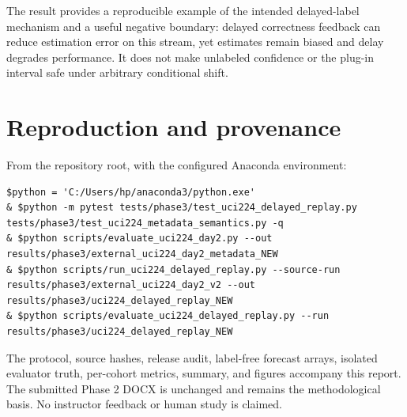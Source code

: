 \documentclass[10pt,a4paper]{article}
\begin{document}
The result provides a reproducible example of the intended delayed-label mechanism and a useful negative boundary: delayed correctness feedback can reduce estimation error on this stream, yet estimates remain biased and delay degrades performance. It does not make unlabeled confidence or the plug-in interval safe under arbitrary conditional shift.

\section*{Reproduction and provenance}
From the repository root, with the configured Anaconda environment:
\begin{verbatim}
$python = 'C:/Users/hp/anaconda3/python.exe'
& $python -m pytest tests/phase3/test_uci224_delayed_replay.py tests/phase3/test_uci224_metadata_semantics.py -q
& $python scripts/evaluate_uci224_day2.py --out results/phase3/external_uci224_day2_metadata_NEW
& $python scripts/run_uci224_delayed_replay.py --source-run results/phase3/external_uci224_day2_v2 --out results/phase3/uci224_delayed_replay_NEW
& $python scripts/evaluate_uci224_delayed_replay.py --run results/phase3/uci224_delayed_replay_NEW
\end{verbatim}
The protocol, source hashes, release audit, label-free forecast arrays, isolated evaluator truth, per-cohort metrics, summary, and figures accompany this report. The submitted Phase 2 DOCX is unchanged and remains the methodological basis. No instructor feedback or human study is claimed.
\end{document}
